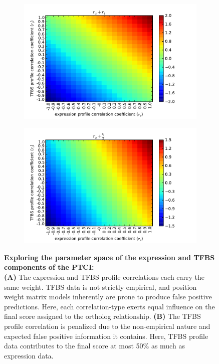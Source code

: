 



\begin{figure}[hp]
\centering
  \begin{subfigure}[b]{.9\linewidth}
    \centering

    \includegraphics[width=.9\linewidth]{figures/figs/thesis-xprn-tfbs.pdf}
    \caption{}
    \label{fig:ptci-space-a}
  \end{subfigure}%

  

  \begin{subfigure}[b]{.9\linewidth}
    \centering

    \includegraphics[width=.9\linewidth]{figures/figs/thesis-xprn-scaled-tfbs.pdf}
    \caption{}
    \label{fig:ptci-space-b}
  \end{subfigure}

\caption[Exploring the parameter space of the expression and TFBS components of the PTCI]{\sf \textbf{Exploring the parameter space of the expression and TFBS components of the PTCI:} \\
\textbf{(A)} The expression and TFBS profile correlations each carry the same weight.  TFBS data is not strictly empirical, and position weight matrix models inherently are prone to produce false positive predictions. Here, each correlation-type exerts equal influence on the final score assigned to the ortholog relationship.  \textbf{(B)} The TFBS profile correlation is penalized due to the non-empirical nature and expected false positive information it contains. Here, TFBS profile data contributes to the final score at most 50\% as much as expression data.}
\label{fig:ptci-space}
\end{figure}